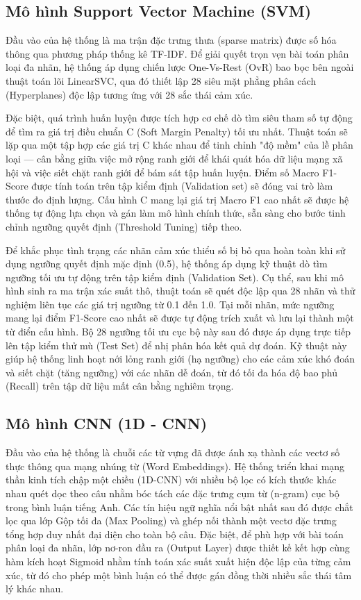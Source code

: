 \subsection{Mô hình Support Vector Machine (SVM)}

Đầu vào của hệ thống là ma trận đặc trưng thưa (sparse matrix) được số hóa thông qua phương pháp thống kê TF-IDF. Để giải quyết trọn vẹn bài toán phân loại đa nhãn, hệ thống áp dụng chiến lược One-Vs-Rest (OvR) bao bọc bên ngoài thuật toán lõi LinearSVC, qua đó thiết lập 28 siêu mặt phẳng phân cách (Hyperplanes) độc lập tương ứng với 28 sắc thái cảm xúc.

Đặc biệt, quá trình huấn luyện được tích hợp cơ chế dò tìm siêu tham số tự động để tìm ra giá trị điều chuẩn C (Soft Margin Penalty) tối ưu nhất. Thuật toán sẽ lặp qua một tập hợp các giá trị C khác nhau để tinh chỉnh "độ mềm" của lề phân loại — cân bằng giữa việc mở rộng ranh giới để khái quát hóa dữ liệu mạng xã hội và việc siết chặt ranh giới để bám sát tập huấn luyện. Điểm số Macro F1-Score được tính toán trên tập kiểm định (Validation set) sẽ đóng vai trò làm thước đo định lượng. Cấu hình C mang lại giá trị Macro F1 cao nhất sẽ được hệ thống tự động lựa chọn và gán làm mô hình chính thức, sẵn sàng cho bước tinh chỉnh ngưỡng quyết định (Threshold Tuning) tiếp theo.

Để khắc phục tình trạng các nhãn cảm xúc thiểu số bị bỏ qua hoàn toàn khi sử dụng ngưỡng quyết định mặc định (0.5), hệ thống áp dụng kỹ thuật dò tìm ngưỡng tối ưu tự động trên tập kiểm định (Validation Set). Cụ thể, sau khi mô hình sinh ra ma trận xác suất thô, thuật toán sẽ quét độc lập qua 28 nhãn và thử nghiệm liên tục các giá trị ngưỡng từ 0.1 đến 1.0. Tại mỗi nhãn, mức ngưỡng mang lại điểm F1-Score cao nhất sẽ được tự động trích xuất và lưu lại thành một từ điển cấu hình. Bộ 28 ngưỡng tối ưu cục bộ này sau đó được áp dụng trực tiếp lên tập kiểm thử mù (Test Set) để nhị phân hóa kết quả dự đoán. Kỹ thuật này giúp hệ thống linh hoạt nới lỏng ranh giới (hạ ngưỡng) cho các cảm xúc khó đoán và siết chặt (tăng ngưỡng) với các nhãn dễ đoán, từ đó tối đa hóa độ bao phủ (Recall) trên tập dữ liệu mất cân bằng nghiêm trọng.

\subsection{Mô hình CNN (1D - CNN)}

Đầu vào của hệ thống là chuỗi các từ vựng đã được ánh xạ thành các vectơ số thực thông qua mạng nhúng từ (Word Embeddings). Hệ thống triển khai mạng thần kinh tích chập một chiều (1D-CNN) với nhiều bộ lọc có kích thước khác nhau quét dọc theo câu nhằm bóc tách các đặc trưng cụm từ (n-gram) cục bộ trong bình luận tiếng Anh. Các tín hiệu ngữ nghĩa nổi bật nhất sau đó được chắt lọc qua lớp Gộp tối đa (Max Pooling) và ghép nối thành một vectơ đặc trưng tổng hợp duy nhất đại diện cho toàn bộ câu. Đặc biệt, để phù hợp với bài toán phân loại đa nhãn, lớp nơ-ron đầu ra (Output Layer) được thiết kế kết hợp cùng hàm kích hoạt Sigmoid nhằm tính toán xác suất xuất hiện độc lập của từng cảm xúc, từ đó cho phép một bình luận có thể được gán đồng thời nhiều sắc thái tâm lý khác nhau.

